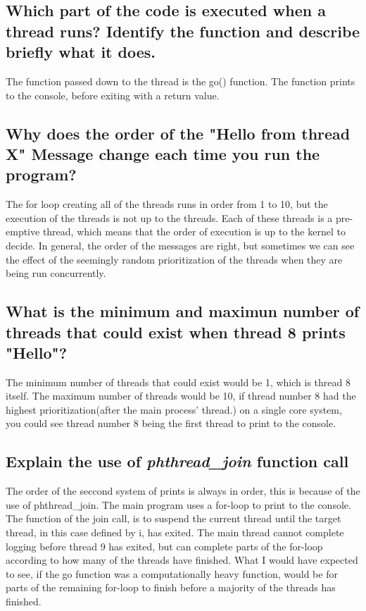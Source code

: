 \documentclass[a4paper]{article}
\begin{document}
\subsection{Which part of the code is executed when a thread runs? Identify the function and describe briefly what it does.}

The function passed down to the thread is the go() function. The function prints to the console, before exiting with a return value.

\subsection{Why does the order of the "Hello from thread X" Message change each time you run the program?}

The for loop creating all of the threads runs in order from 1 to 10, but the execution of the threads is not up to the threads. Each of these threads is a pre-emptive thread, which means that the order of execution is up to the kernel to decide. In general, the order of the messages are right, but sometimes we can see the effect of the seemingly random prioritization of the threads when they are being run concurrently. 

\subsection{What is the minimum and maximun number of threads that could exist when thread 8 prints "Hello"?}

The minimum number of threads that could exist would be 1, which is thread 8 itself. The maximum number of threads would be 10, if thread number 8 had the highest prioritization(after the main process' thread.) on a single core system, you could see thread number 8 being the first thread to print to the console. 

\subsection{Explain the use of {\it phthread\_join} function call}

The order of the seccond system of prints is always in order, this is because of the use of phthread\_join. The main program uses a for-loop to print to the console. The function of the join call, is to suspend the current thread until the target thread, in this case defined by i, has exited. The main thread cannot complete logging before thread 9 has exited, but can complete parts of the for-loop according to how many of the threads have finished. What I would have expected to see, if the go function was a computationally heavy function, would be for parts of the remaining for-loop to finish before a majority of the threads has finished.
\end{document}
